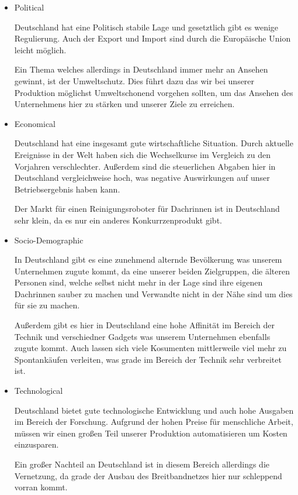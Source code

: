         \begin{itemize}
            \item Political
            
                Deutschland hat eine Politisch stabile Lage und gesetztlich gibt es wenige Regulierung. Auch der Export
                und Import sind durch die Europäische Union leicht möglich.

                Ein Thema welches allerdings in Deutschland immer mehr an Ansehen gewinnt, ist der Umweltschutz. Dies 
                führt dazu das wir bei unserer Produktion möglichst Umweltschonend vorgehen sollten, um das Ansehen des
                Unternehmens hier zu stärken und unserer Ziele  zu erreichen.

            \item Economical
            
                Deutschland hat eine insgesamt gute wirtschaftliche Situation. Durch aktuelle Ereignisse in der Welt 
                haben sich die Wechselkurse im Vergleich zu den Vorjahren verschlechter. Außerdem sind die steuerlichen 
                Abgaben hier in Deutschland vergleichweise hoch, was negative Auswirkungen auf unser Betriebsergebnis
                haben kann.

                Der Markt für einen Reinigungsroboter für Dachrinnen ist in Deutschland sehr klein, da es nur ein 
                anderes Konkurrzenprodukt gibt.

            \item Socio-Demographic
            
                In Deutschland gibt es eine zunehmend alternde Bevölkerung was unserem Unternehmen zugute kommt, da eine
                unserer beiden Zielgruppen, die älteren Personen sind, welche selbst nicht mehr in der Lage sind ihre 
                eigenen Dachrinnen sauber zu machen und Verwandte nicht in der Nähe sind um dies für sie zu machen.

                Außerdem gibt es hier in Deutschland eine hohe Affinität im Bereich der Technik und verschiedner Gadgets
                was unserem Unternehmen ebenfalls zugute kommt. Auch lassen sich viele Kosumenten mittlerweile viel mehr 
                zu Spontankäufen verleiten, was grade im Bereich der Technik sehr verbreitet ist.

            \item Technological
            
                Deutschland bietet gute technologische Entwicklung und auch hohe Ausgaben im Bereich der Forschung. 
                Aufgrund der hohen Preise für menschliche Arbeit, müssen wir einen großen Teil unserer Produktion 
                automatisieren um Kosten einzusparen.

                Ein großer Nachteil an Deutschland ist in diesem Bereich allerdings die Vernetzung, da grade der Ausbau
                des Breitbandnetzes hier nur schleppend vorran kommt.
        \end{itemize}